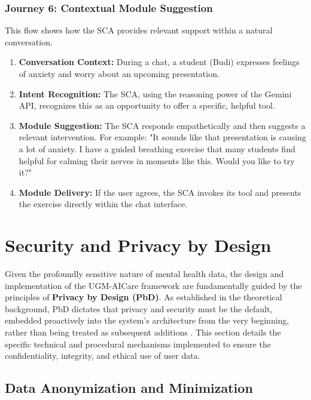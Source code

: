 \subsubsection{Journey 6: Contextual Module Suggestion}
This flow shows how the SCA provides relevant support within a natural conversation.
\begin{enumerate}
    \item \textbf{Conversation Context:} During a chat, a student (Budi) expresses feelings of anxiety and worry about an upcoming presentation.
    \item \textbf{Intent Recognition:} The SCA, using the reasoning power of the Gemini API, recognizes this as an opportunity to offer a specific, helpful tool.
    \item \textbf{Module Suggestion:} The SCA responds empathetically and then suggests a relevant intervention. For example: "It sounds like that presentation is causing a lot of anxiety. I have a guided breathing exercise that many students find helpful for calming their nerves in moments like this. Would you like to try it?"
    \item \textbf{Module Delivery:} If the user agrees, the SCA invokes its  tool and presents the exercise directly within the chat interface.
\end{enumerate}


\section{Security and Privacy by Design}

Given the profoundly sensitive nature of mental health data, the design and implementation of the UGM-AICare framework are fundamentally guided by the principles of \textbf{Privacy by Design (PbD)}. As established in the theoretical background, PbD dictates that privacy and security must be the default, embedded proactively into the system's architecture from the very beginning, rather than being treated as subsequent additions \cite{FIND_CITATION_PLEASE}. This section details the specific technical and procedural mechanisms implemented to ensure the confidentiality, integrity, and ethical use of user data.

\subsection{Data Anonymization and Minimization}

